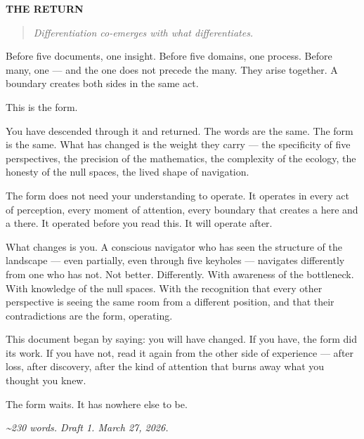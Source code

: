 \vspace{1cm}
\begin{center}
{\Large\sffamily\bfseries\color{headerblue} THE RETURN}
\end{center}
\vspace{0.5cm}


\begin{quote}
\itshape
\textit{Differentiation co-emerges with what differentiates.}
\end{quote}


\bigskip\noindent\makebox[\textwidth]{\color{rulegray}\rule{5cm}{0.3pt}}\bigskip


Before five documents, one insight. Before five domains, one process. Before many, one — and the one does not precede the many. They arise together. A boundary creates both sides in the same act.


This is the form.


You have descended through it and returned. The words are the same. The form is the same. What has changed is the weight they carry — the specificity of five perspectives, the precision of the mathematics, the complexity of the ecology, the honesty of the null spaces, the lived shape of navigation.


The form does not need your understanding to operate. It operates in every act of perception, every moment of attention, every boundary that creates a here and a there. It operated before you read this. It will operate after.


What changes is you. A conscious navigator who has seen the structure of the landscape — even partially, even through five keyholes — navigates differently from one who has not. Not better. Differently. With awareness of the bottleneck. With knowledge of the null spaces. With the recognition that every other perspective is seeing the same room from a different position, and that their contradictions are the form, operating.


This document began by saying: you will have changed. If you have, the form did its work. If you have not, read it again from the other side of experience — after loss, after discovery, after the kind of attention that burns away what you thought you knew.


The form waits. It has nowhere else to be.


\bigskip\noindent\makebox[\textwidth]{\color{rulegray}\rule{5cm}{0.3pt}}\bigskip


\textit{\textasciitilde{}230 words. Draft 1. March 27, 2026.}

